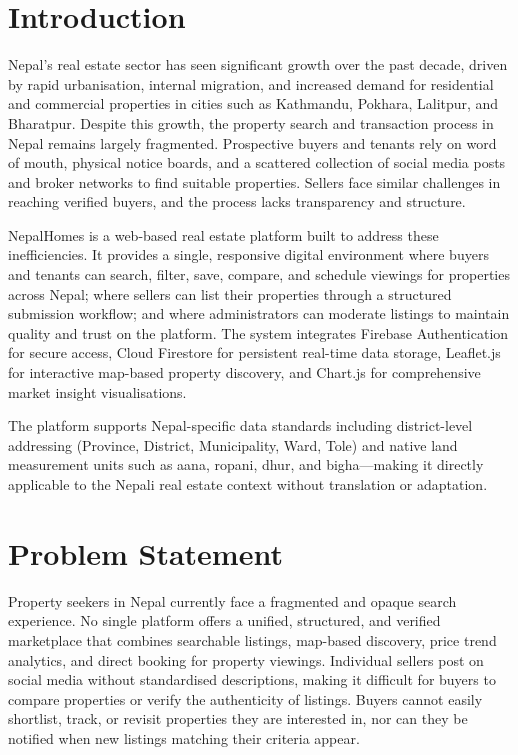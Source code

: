 \documentclass[12pt,a4paper]{report}
\begin{document}
\section{Introduction}

Nepal's real estate sector has seen significant growth over the past decade,
driven by rapid urbanisation, internal migration, and increased demand for
residential and commercial properties in cities such as Kathmandu, Pokhara,
Lalitpur, and Bharatpur. Despite this growth, the property search and
transaction process in Nepal remains largely fragmented. Prospective buyers and
tenants rely on word of mouth, physical notice boards, and a scattered collection
of social media posts and broker networks to find suitable properties. Sellers
face similar challenges in reaching verified buyers, and the process lacks
transparency and structure.

NepalHomes is a web-based real estate platform built to address these
inefficiencies. It provides a single, responsive digital environment where buyers
and tenants can search, filter, save, compare, and schedule viewings for
properties across Nepal; where sellers can list their properties through a
structured submission workflow; and where administrators can moderate listings to
maintain quality and trust on the platform. The system integrates Firebase
Authentication for secure access, Cloud Firestore for persistent real-time data
storage, Leaflet.js for interactive map-based property discovery, and Chart.js for
comprehensive market insight visualisations.

The platform supports Nepal-specific data standards including district-level
addressing (Province, District, Municipality, Ward, Tole) and native land
measurement units such as aana, ropani, dhur, and bigha---making it directly
applicable to the Nepali real estate context without translation or adaptation.

\section{Problem Statement}

Property seekers in Nepal currently face a fragmented and opaque search
experience. No single platform offers a unified, structured, and verified
marketplace that combines searchable listings, map-based discovery, price trend
analytics, and direct booking for property viewings. Individual sellers post on
social media without standardised descriptions, making it difficult for buyers
to compare properties or verify the authenticity of listings. Buyers cannot
easily shortlist, track, or revisit properties they are interested in, nor can
they be notified when new listings matching their criteria appear.
\end{document}
